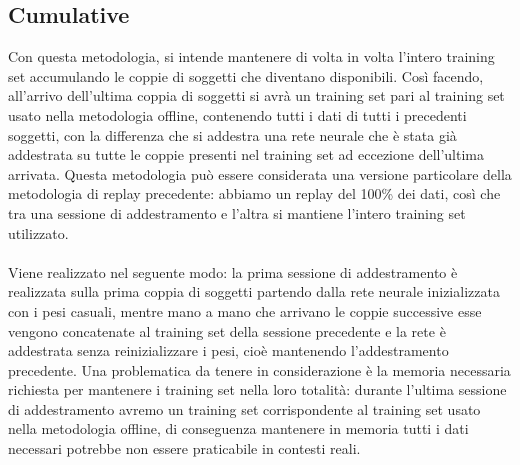 \subsection{Cumulative}  %
Con questa metodologia, si intende mantenere di volta in volta l'intero training set accumulando le coppie di soggetti che diventano disponibili. Così facendo, all'arrivo dell'ultima coppia di soggetti si avrà un training set pari al training set usato nella metodologia offline, contenendo tutti i dati di tutti i precedenti soggetti, con la differenza che si addestra una rete neurale che è stata già addestrata su tutte le coppie presenti nel training set ad eccezione dell'ultima arrivata. Questa metodologia può essere considerata una versione particolare della metodologia di replay precedente: abbiamo un replay del 100\% dei dati, così che tra una sessione di addestramento e l'altra si mantiene l'intero training set utilizzato.\\\\
Viene realizzato nel seguente modo: la prima sessione di addestramento è realizzata sulla prima coppia di soggetti partendo dalla rete neurale inizializzata con i pesi casuali, mentre mano a mano che arrivano le coppie successive esse vengono concatenate al training set della sessione precedente e la rete è addestrata senza reinizializzare i pesi, cioè mantenendo l'addestramento precedente. Una problematica da tenere in considerazione è la memoria necessaria richiesta per mantenere i training set nella loro totalità: durante l'ultima sessione di addestramento avremo un training set corrispondente al training set usato nella metodologia offline, di conseguenza mantenere in memoria tutti i dati necessari potrebbe non essere praticabile in contesti reali.

